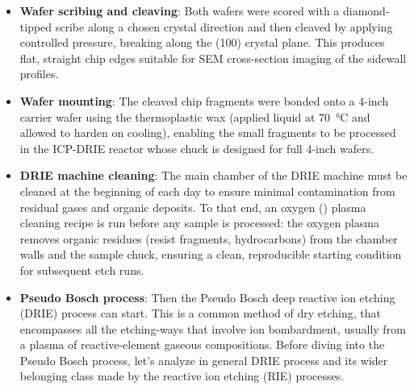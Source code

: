 \begin{itemize}
  \item \textbf{Wafer scribing and cleaving}: Both wafers were scored
    with a diamond-tipped scribe along a chosen crystal direction and then
    cleaved by applying controlled pressure, breaking along the (100) crystal
    plane. This produces flat, straight chip edges suitable for SEM
    cross-section imaging of the sidewall profiles.

  \item \textbf{Wafer mounting}: The cleaved chip fragments were bonded
    onto a 4-inch carrier wafer using the thermoplastic wax (applied liquid at
    \SI{70}{\degreeCelsius} and allowed to harden on cooling), enabling the
    small fragments to be processed in the ICP-DRIE reactor whose chuck is
    designed for full 4-inch wafers.

  \item \textbf{DRIE machine cleaning}: The main chamber of the DRIE
    machine must be cleaned at the beginning of each day to ensure minimal
    contamination from residual gases and organic deposits. To that end, an
    oxygen () plasma cleaning recipe is run before any sample is
    processed: the oxygen plasma removes organic residues (resist fragments,
    hydrocarbons) from the chamber walls and the sample chuck, ensuring a
    clean, reproducible starting condition for subsequent etch runs.

  \item \textbf{Pseudo Bosch process}: Then the Pseudo Bosch deep reactive
    ion etching (DRIE)
    process can start.
    This is a common method of dry etching, that encompasses all the
    etching-ways that involve ion bombardment, usually from a plasma of
    reactive-element gaseous compositions.
    Before diving into the Pseudo Bosch process, let's analyze in
    general DRIE process and
    its wider belonging class made by the reactive ion
    etching (RIE) processes.


\end{itemize}
